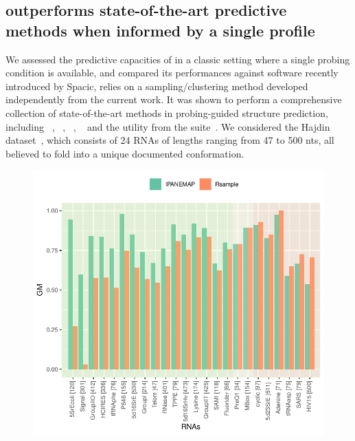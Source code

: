 \documentclass[a4,center,fleqn]{NAR}
\begin{document}
 







\subsection*{\OurTool outperforms state-of-the-art predictive methods when informed by a single profile}
We assessed the predictive capacities of \OurTool in a classic setting where a single probing condition is available, and compared its performances against  software recently introduced by Spacic\etal\cite{Spasic2017},  relies on a sampling/clustering method developed independently from the current work. It was shown to perform  a comprehensive collection of state-of-the-art methods in probing-guided structure prediction, including ~\citep{Wu2015}, ~\citep{Deng2016}, ~\citep{Washietl2012}, ~\citep{Zarringhalam2012} and the  utility from the  suite~\citep{Reuter2010}.
We considered the Hajdin dataset~\cite{Hajdin2013}, which consists of 24 RNAs of lengths ranging from 47 to 500 nts, all believed to fold into a unique documented conformation. 

\begin{figure}
	\includegraphics[width=\linewidth]{graphs/RsampleVsIPANEMAP/Accuracy}
	\caption{ \label{fig:Vsrsample}}
\end{figure}
\end{document}
